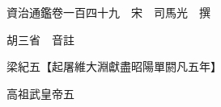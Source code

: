 










 


 
 


 

  
  
  
  
  





  
  
  
  
  
 
  

  

  
  
  



  

 
 

  
   




  

  
  


  　　資治通鑑卷一百四十九　宋　司馬光　撰

　　胡三省　音註

　　梁紀五【起屠維大淵獻盡昭陽單閼凡五年】

　　高祖武皇帝五

